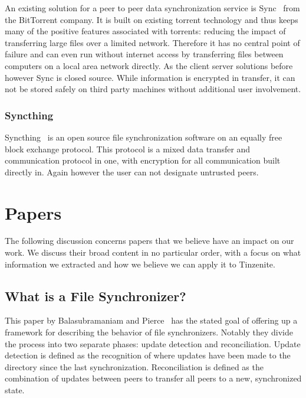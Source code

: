 An existing solution for a peer to peer data synchronization service is Sync~\cite{web:site:bittorrent_sync} from the BitTorrent company.
It is built on existing torrent technology and thus keeps many of the positive features associated with torrents: reducing the impact of transferring large files over a limited network.
Therefore it has no central point of failure and can even run without internet access by transferring files between computers on a local area network directly.
As the client server solutions before however Sync is closed source.
While information is encrypted in transfer, it can not be stored safely on third party machines without additional user involvement.

\subsubsection{Syncthing}
\label{subs:Syncthing}

Syncthing~\cite{web:site:synthing} is an open source file synchronization software on an equally free block exchange protocol.
This protocol is a mixed data transfer and communication protocol in one, with encryption for all communication built directly in.
Again however the user can not designate untrusted peers.

\section{Papers}
\label{sec:Papers}

The following discussion concerns papers that we believe have an impact on our work.
We discuss their broad content in no particular order, with a focus on what information we extracted and how we believe we can apply it to Tinzenite.

\subsection{What is a File Synchronizer?}
\label{sub:What is a File Synchronizer?}

This paper by Balasubramaniam and Pierce~\cite{balasubramaniam1998file} has the stated goal of offering up a framework for describing the behavior of file synchronizers.
Notably they divide the process into two separate phases: update detection and reconciliation.
Update detection is defined as the recognition of where updates have been made to the directory since the last synchronization.
Reconciliation is defined as the combination of updates between peers to transfer all peers to a new, synchronized state.

